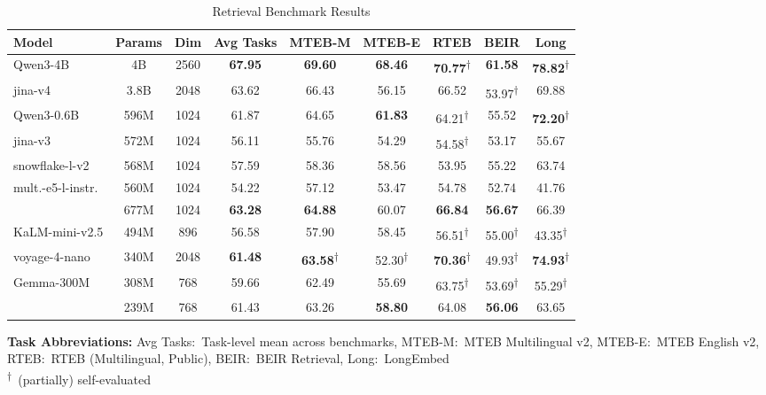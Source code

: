 \documentclass[11pt]{article}
\begin{document}
\begin{table}[t]
\caption{Retrieval Benchmark Results}
\label{tab:retrieval_benchmarks}
\centering
\small
\setlength{\tabcolsep}{3pt}
\begin{tabular}{@{}lcccccccc@{}}
\toprule
\textbf{Model} & \textbf{Params} & \textbf{Dim} & \textbf{Avg Tasks} & \textbf{MTEB-M} & \textbf{MTEB-E} & \textbf{RTEB} & \textbf{BEIR} & \textbf{Long} \\
\midrule
Qwen3-4B                & 4B    & 2560 & \textbf{67.95} & \textbf{69.60} & \textbf{68.46} & \textbf{70.77}\textsuperscript{†} & \textbf{61.58} & \textbf{78.82}\textsuperscript{†} \\
jina-v4                 & 3.8B  & 2048 & 63.62    & 66.43 & 56.15 & 66.52 & 53.97\textsuperscript{†}  & 69.88 \\
\midrule
Qwen3-0.6B             & 596M  & 1024 & 61.87 & 64.65 & \textbf{61.83} & 64.21\textsuperscript{†} & 55.52 & \textbf{72.20}\textsuperscript{†} \\
jina-v3                 & 572M  & 1024 & 56.11 & 55.76 & 54.29 & 54.58\textsuperscript{†} & 53.17 & 55.67 \\
snowflake-l-v2          & 568M  & 1024 & 57.59 & 58.36 & 58.56 & 53.95 & 55.22 & 63.74 \\
mult.-e5-l-instr.       & 560M  & 1024 & 54.22 & 57.12 & 53.47 & 54.78 & 52.74 & 41.76 \\
\JEmbeddingVFiveTextSmallShort{}         & 677M  & 1024 & \textbf{63.28} & \textbf{64.88} & 60.07 & \textbf{66.84} & \textbf{56.67} & 66.39 \\
\midrule
KaLM-mini-v2.5          & 494M  & 896  & 56.58 & 57.90 & 58.45 & 56.51\textsuperscript{†} & 55.00\textsuperscript{†} & 43.35\textsuperscript{†} \\
voyage-4-nano           & 340M  & 2048 & \textbf{61.48} & \textbf{63.58}\textsuperscript{†} & 52.30\textsuperscript{†} & \textbf{70.36}\textsuperscript{†} & 49.93\textsuperscript{†} & \textbf{74.93}\textsuperscript{†} \\
Gemma-300M              & 308M  & 768  & 59.66 & 62.49 & 55.69 & 63.75\textsuperscript{†} & 53.69\textsuperscript{†} & 55.29\textsuperscript{†} \\
\JEmbeddingVFiveTextNanoShort{}          & 239M  & 768  & 61.43 & 63.26 & \textbf{58.80} & 64.08 & \textbf{56.06} & 63.65 \\
\bottomrule
\end{tabular}
\medskip
\begin{flushleft}
\textbf{Task Abbreviations:}
Avg Tasks:~Task-level mean across benchmarks,
MTEB-M:~MTEB Multilingual v2,
MTEB-E:~MTEB English v2,
RTEB:~RTEB (Multilingual, Public),
BEIR:~BEIR Retrieval,
Long:~LongEmbed\\
\textsuperscript{†}~(partially) self-evaluated
\end{flushleft}
\end{table}
\end{document}
